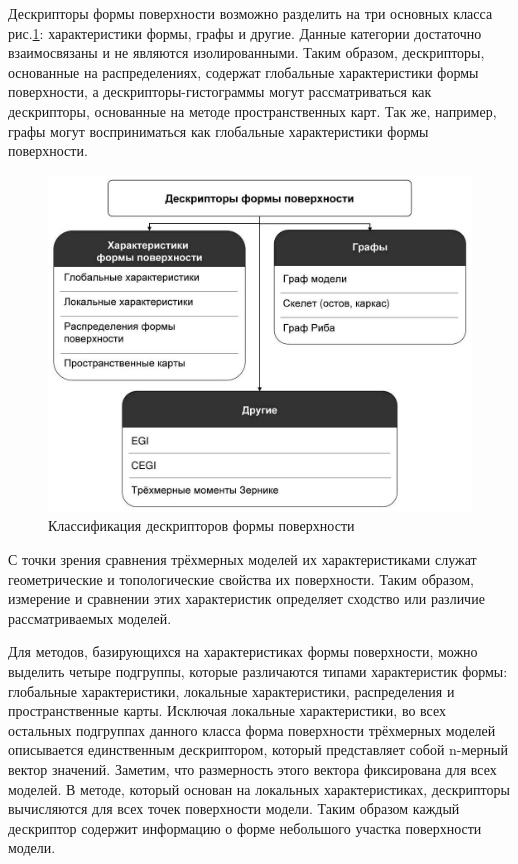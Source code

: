 \documentclass[14pt]{article}
\numberwithin{figure}{section}
\numberwithin{equation}{section}
\begin{document}
Дескрипторы формы поверхности возможно разделить на три основных класса рис.\ref{ris:1}: характеристики формы, графы и другие. Данные категории достаточно взаимосвязаны и не являются изолированными. Таким образом, дескрипторы, основанные на распределениях, содержат глобальные характеристики формы поверхности, а дескрипторы-гистограммы могут рассматриваться как дескрипторы, основанные на методе пространственных карт. Так же, например, графы могут восприниматься как глобальные характеристики формы поверхности.

\begin{figure}[h]
	\begin{center}
		\includegraphics[scale=0.46]{1.JPG}
		\caption{Классификация дескрипторов формы поверхности}
		\label{ris:1}
	\end{center}
\end{figure}

С точки зрения сравнения трёхмерных моделей их характеристиками служат геометрические и топологические свойства их поверхности. Таким образом, измерение и сравнении этих характеристик определяет сходство или различие рассматриваемых моделей.

Для методов, базирующихся на характеристиках формы поверхности, можно выделить четыре подгруппы, которые различаются типами характеристик формы: глобальные характеристики, локальные характеристики, распределения и пространственные карты. Исключая локальные характеристики, во всех остальных подгруппах данного класса форма поверхности трёхмерных моделей описывается единственным дескриптором, который представляет собой n-мерный вектор значений. Заметим, что размерность этого вектора фиксирована для всех моделей. В методе, который основан на локальных характеристиках, дескрипторы вычисляются для всех точек поверхности модели. Таким образом каждый дескриптор содержит информацию о форме небольшого участка поверхности модели.
\end{document}
